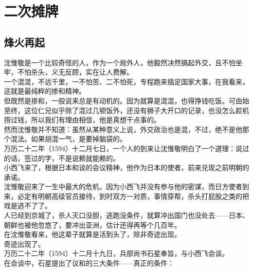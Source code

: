 \section{二次摊牌}
\ifnum{}
	\begin{multicols}{\theparacolNo}
\fi
\subsection{烽火再起}
沈惟敬是一个比较奇怪的人，作为一个局外人，他毅然决然搞起外交，且不怕坐牢，不怕杀头，义无反顾，实在让人费解。\\

一个混混，不远千里，一不怕苦、二不怕死，专程跑来插足国家大事，在我看来，这就是最纯粹的掺和精神。\\

但既然是掺和，一般说来总是有动机的。因为就算是混混，也得挣钱吃饭。可由始至终，这位仁兄似乎除了混过几顿饭外，还没有狮子大开口的记录，也没怎么趁机捞过钱，所以我们有理由相信，他是真想干点事的。\\

然而沈惟敬并不知道：虽然从某种意义上说，外交政治也是混，不过，绝不是他那个混法。如果胡混一气，是要掉脑袋的。\\

万历二十二年（1594）十二月七日，一个人的到来让沈惟敬明白了一个道理：说过的话，签过的字，不是说赖就能赖的。\\

小西飞来了，根据日本和谈的会议精神，他作为日本的使者，前来兑现之前明朝的承诺。\\

沈惟敬迎来了一生中最大的危机，因为小西飞并没有参与他的密谋，而日方使者到来，必定有明朝高级官员接待，到时双方一对质，事情穿帮，杀头打屁股之类的把戏是逃不了了。\\

人已经到京城了，杀人灭口没胆，逃跑没条件，就算冲出国门也没处去——日本、朝鲜也被他忽悠了，要冲出亚洲，估计还得再等个几百年。\\

在沈惟敬看来，他这辈子就算是活到头了，除非奇迹出现。\\

奇迹出现了。\\

万历二十二年（1594）十二月十九日，兵部尚书石星奉旨，与小西飞会谈。\\

在会谈中，石星提出了议和的三大条件——真正的条件：\\


\end{multicols}
